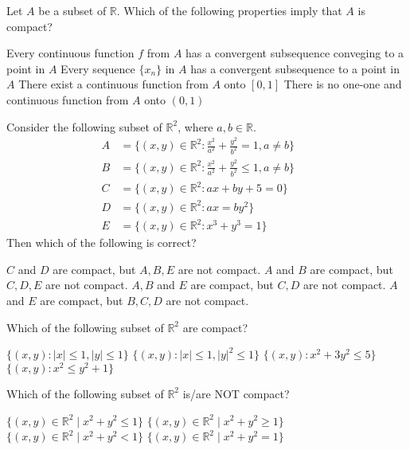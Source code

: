 \documentclass[10pt]{exam}
\newcommand{\R}{\ensuremath{\mathbb{R}}}
\begin{document}
\begin{questions}
\question 
Let $A$ be a subset of $\mathbb{R}$. Which of the following properties imply that $A$ is compact?

\begin{checkboxes}
\choice Every continuous function $f$ from $A$ has a convergent subsequence conveging to a point in $A$ 
\choice Every sequence $\{x_n\} $ in $A$ has a convergent subsequence to a point in $A$ 
\choice There exist a continuous function from $A$ onto $[0,1]$
\choice There is no one-one and continuous function from $A$ onto $(0,1)$
\end{checkboxes}

\question
Consider the following subset of $\mathbb{R}^2$, where $a,b \in \mathbb{R}$.
\begin{align*}
A&=\lbrace (x,y)\in \mathbb{R}^2:\frac{x^2}{a^2}+\frac{y^2}{b^2} = 1, a \neq b \rbrace &&\\
B&=\lbrace (x,y)\in \mathbb{R}^2:\frac{x^2}{a^2}+\frac{y^2}{b^2} \leq 1, a \neq b \rbrace \\
C&=\lbrace (x,y)\in \mathbb{R}^2:ax+by+5=0 \rbrace \\
D&=\lbrace (x,y)\in \mathbb{R}^2:ax=by^2 \rbrace \\
E&=\lbrace (x,y)\in \mathbb{R}^2:x^3+y^3=1 \rbrace
\end{align*}
Then which of the following is correct?
\begin{choices}
\choice $C$ and $D$ are compact, but $A,B,E$ are not compact.
\choice $A$ and $B$ are compact, but $C,D,E$ are not compact.
\choice $A,B$ and $E$ are compact, but $C,D$ are not compact.
\choice $A$ and $E$ are compact, but $B,C,D$ are not compact.
\end{choices}

\question
Which of the following subset of $\R^2$ are compact?

\begin{checkboxes}
\choice $\{(x,y): |x| \leq 1, |y| \leq 1 \}$
\choice $\{(x,y): |x| \leq 1, |y|^2 \leq 1 \}$
\choice $\{(x,y): x^2+3y^2 \leq 5 \}$
\choice $\{(x,y): x^2 \leq y^2+1  \}$ 
\end{checkboxes}

\question 
Which of the following subset of $\mathbb{R}^2$ is/are NOT compact?

\begin{checkboxes}
\choice $\{(x,y)\in \mathbb{R}^2 \mid x^2+y^2 \leq 1 \}$
\choice $\{(x,y)\in \mathbb{R}^2 \mid x^2+y^2 \geq 1 \}$
\choice $\{(x,y)\in \mathbb{R}^2 \mid x^2+y^2 <    1 \}$
\choice $\{(x,y)\in \mathbb{R}^2 \mid x^2+y^2 =    1 \}$
\end{checkboxes}




\end{questions}
\end{document}
